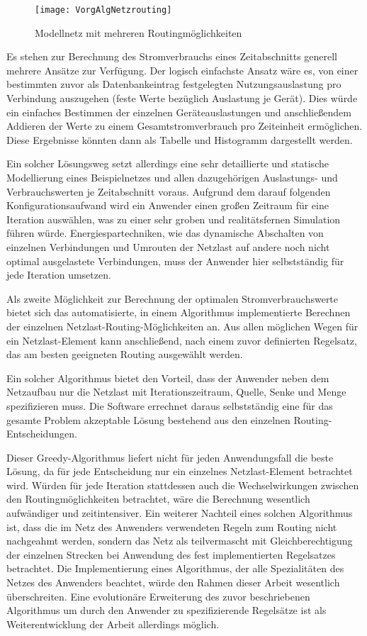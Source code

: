 \begin{figure}[htb]
	\centering
	\texttt{[image: VorgAlgNetzrouting]}
	\caption{Modellnetz mit mehreren Routingmöglichkeiten}
	\label{fig:VorgAlgNetzrouting}
\end{figure}

Es stehen zur Berechnung des Stromverbrauchs eines Zeitabschnitts generell mehrere Ansätze zur Verfügung. Der logisch einfachste Ansatz wäre es, von einer bestimmten zuvor als Datenbankeintrag festgelegten Nutzungsauslastung pro Verbindung auszugehen (feste Werte bezüglich Auslastung je Gerät). Dies würde ein einfaches Bestimmen der einzelnen Geräte\-aus\-las\-tungen und anschließendem Addieren der Werte zu einem Gesamtstromverbrauch pro Zeiteinheit ermöglichen. Diese Ergebnisse könnten dann als Tabelle und Histogramm dargestellt werden.

Ein solcher Lösungsweg setzt allerdings eine sehr detaillierte und statische Modellierung eines Beispielnetzes und allen dazugehörigen Auslastungs- und Verbrauchswerten je Zeitabschnitt voraus. Aufgrund dem darauf folgenden Konfigurationsaufwand wird ein Anwender einen großen Zeitraum für eine Iteration auswählen, was zu einer sehr groben und realitätsfernen Simulation führen würde. Energiespartechniken, wie das dynamische Abschalten von einzelnen Verbindungen und Umrouten der Netzlast auf andere noch nicht optimal ausgelastete Verbindungen, muss der Anwender hier selbstständig für jede Iteration umsetzen.

Als zweite Möglichkeit zur Berechnung der optimalen Stromverbrauchswerte bietet sich das automatisierte, in einem Algorithmus implementierte Berechnen der einzelnen Netz\-last-Routing-Mög\-lich\-kei\-ten an. Aus allen möglichen Wegen für ein Netzlast-Element kann anschließend, nach einem zuvor definierten Regelsatz, das am besten geeigneten Routing ausgewählt werden.

Ein solcher Algorithmus bietet den Vorteil, dass der Anwender neben dem Netzaufbau nur die Netzlast mit Iterationszeitraum, Quelle, Senke und Menge spezifizieren muss. Die Software errechnet daraus selbstständig eine für das gesamte Problem akzeptable Lösung bestehend aus den einzelnen Routing-Entscheidungen.

Dieser Greedy-Algorithmus liefert nicht für jeden Anwendungsfall die beste Lösung, da für jede Entscheidung nur ein einzelnes Netzlast-Element betrachtet wird.
Würden für jede Iteration stattdessen auch die Wechselwirkungen zwischen den Routingmöglichkeiten betrachtet, wäre die Berechnung wesentlich aufwändiger und zeitintensiver.
Ein weiterer Nachteil eines solchen Algorithmus ist, dass die im Netz des Anwenders verwendeten Regeln zum Routing nicht nachgeahmt werden, sondern das Netz als teilvermascht mit Gleichberechtigung der einzelnen Strecken bei Anwendung des fest implementierten Regelsatzes betrachtet.
Die Implementierung eines Algorithmus, der alle Spezialitäten des Netzes des Anwenders beachtet, würde den Rahmen dieser Arbeit wesentlich überschreiten. Eine evolutionäre Erweiterung des zuvor beschriebenen Algorithmus um durch den Anwender zu spezifizierende Regelsätze ist als Weiterentwicklung der Arbeit allerdings möglich.

